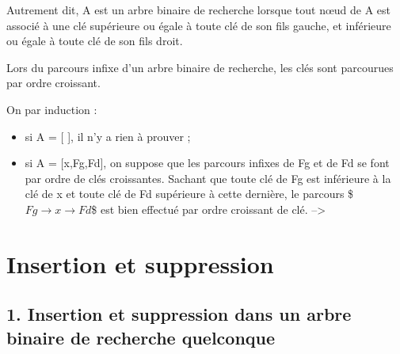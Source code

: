 \documentclass[letterpaper,10pt,english]{jupyterBook}
\begin{document}
\sphinxAtStartPar
Autrement dit, A est un arbre binaire de recherche lorsque tout nœud de A est associé à une clé supérieure ou
égale à toute clé de son fils gauche, et inférieure ou égale à toute clé de son fils droit.



\sphinxAtStartPar
{} Lors du parcours infixe d’un arbre binaire de recherche, les clés sont parcourues par ordre croissant.

\sphinxAtStartPar
{} On  par induction :
\begin{itemize}
\item {} 
\sphinxAtStartPar
si A = {[} {]}, il n’y a rien à prouver ;

\item {} 
\sphinxAtStartPar
si A = {[}x,Fg,Fd{]}, on suppose que les parcours infixes de Fg et de Fd se font par ordre de clés croissantes.
Sachant que toute clé de Fg est inférieure à la clé de x et toute clé de Fd supérieure à cette dernière, le parcours \$\(Fg \rightarrow x\rightarrow Fd\)\$ est bien effectué par ordre croissant de clé.
–>

\end{itemize}




\section{Insertion et suppression}
\label{\detokenize{notebooks/ABR/ABR:insertion-et-suppression}}

\subsection{1. Insertion et suppression dans un arbre binaire de recherche quelconque}
\label{\detokenize{notebooks/ABR/ABR:insertion-et-suppression-dans-un-arbre-binaire-de-recherche-quelconque}}
\end{document}
